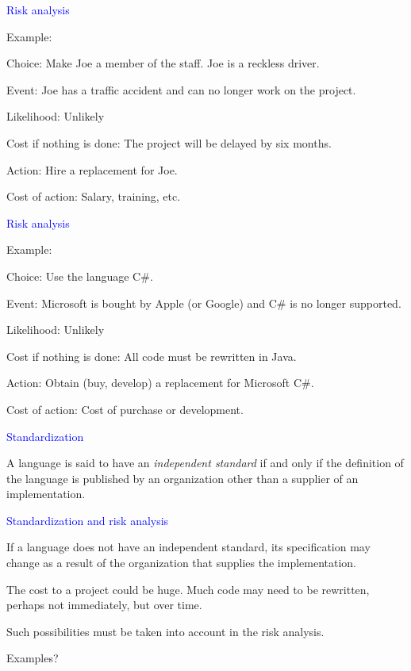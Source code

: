 \documentclass{slides}
\newcommand{\ti}[1]{\begin{center}\Large{\textcolor{blue}{#1}}\end{center}}
\begin{document}
\begin{slide}\ti{Risk analysis}

Example:

Choice: Make Joe a member of the staff.  Joe is a reckless driver.

Event: Joe has a traffic accident and can no longer work on the
project.

Likelihood: Unlikely

Cost if nothing is done: The project will be delayed by six months.

Action: Hire a replacement for Joe.

Cost of action: Salary, training, etc.

\vfill\end{slide}
\begin{slide}\ti{Risk analysis}

Example:

Choice: Use the language C\#.

Event: Microsoft is bought by Apple (or Google) and C\# is no longer
supported.

Likelihood: Unlikely

Cost if nothing is done: All code must be rewritten in Java.

Action: Obtain (buy, develop) a replacement for Microsoft C\#.

Cost of action: Cost of purchase or development.

\vfill\end{slide}
\begin{slide}\ti{Standardization}

A language is said to have an \emph{independent standard} if and only
if the definition of the language is published by an organization
other than a supplier of an implementation.

\vfill\end{slide}
\begin{slide}\ti{Standardization and risk analysis}

If a language does not have an independent standard, its specification
may change as a result of the organization that supplies the
implementation.

The cost to a project could be huge.  Much code may need to be
rewritten, perhaps not immediately, but over time.

Such possibilities must be taken into account in the risk analysis.

Examples?

\vfill\end{slide}
\end{document}

